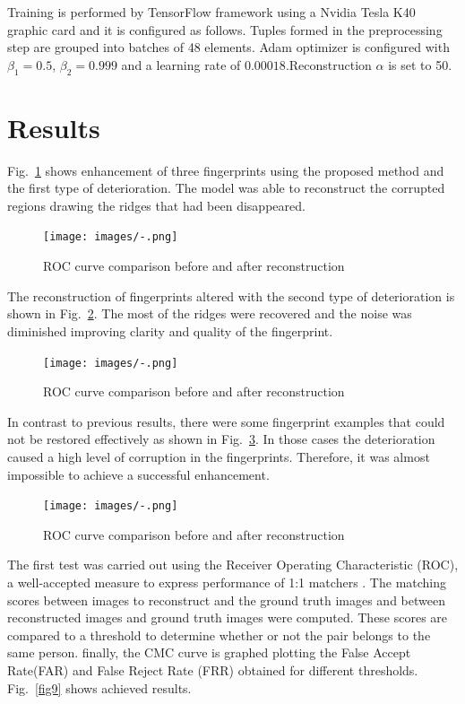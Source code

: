 \documentclass[a4paper,fleqn]{cas-dc}
\begin{document}
Training is performed by TensorFlow framework using a Nvidia Tesla K40 graphic card and it is configured as follows. Tuples formed in the preprocessing step are grouped into batches of 48 elements. Adam optimizer is configured with $\beta_{1}=0.5$, $\beta_{2}=0.999$ and a learning rate of $0.00018$.Reconstruction $\alpha$ is set to 50.

\section{Results}
\label{sec:R}

Fig.~\ref{fig6} shows enhancement of three fingerprints using the proposed method and the first type of deterioration. The model was able to reconstruct the corrupted regions drawing the ridges that had been disappeared.

\begin{figure}[htbp]
\centerline{\texttt{[image: images/-.png]}}
\caption{ROC curve comparison before and after reconstruction}
\label{fig6}
\end{figure}

The reconstruction of fingerprints altered with the second type of deterioration is shown in Fig.~\ref{fig7}. The most of the ridges were recovered and the noise was diminished improving clarity and quality of the fingerprint.

\begin{figure}[htbp]
\centerline{\texttt{[image: images/-.png]}}
\caption{ROC curve comparison before and after reconstruction}
\label{fig7}
\end{figure}

In contrast to previous results, there were some fingerprint examples that could not be restored effectively as shown in Fig.~\ref{fig8}. In those cases the deterioration caused a high level of corruption in the fingerprints. Therefore, it was almost impossible to achieve a successful enhancement.

\begin{figure}[htbp]
\centerline{\texttt{[image: images/-.png]}}
\caption{ROC curve comparison before and after reconstruction}
\label{fig8}
\end{figure}

The first test was carried out using the Receiver Operating Characteristic (ROC), a well-accepted measure to express performance of 1:1 matchers \hyperref[sec:ref6]{\cite{b6}}. The matching scores between images to reconstruct and the ground truth images and between reconstructed images and ground truth images were computed. These scores are compared to a threshold to determine whether or not the pair belongs to the same person. finally, the CMC curve is graphed plotting the False Accept Rate(FAR) and False Reject Rate (FRR) obtained for different thresholds. Fig.~\ref{fig9} shows achieved results.
\end{document}
